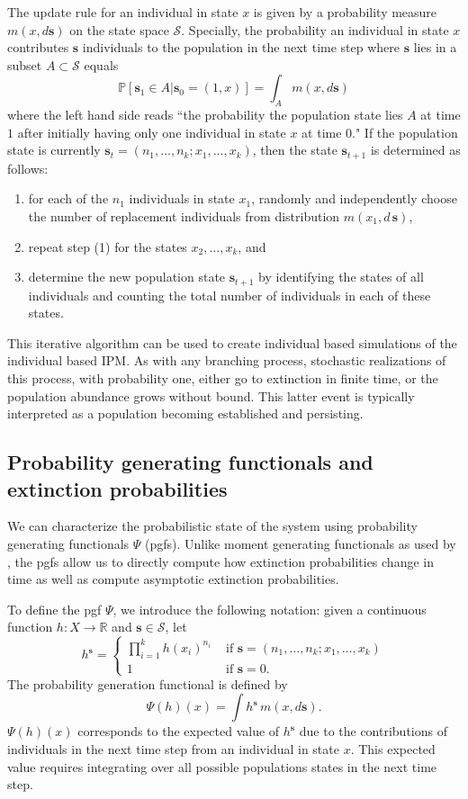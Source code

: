 \documentclass[12pt]{amsart}\usepackage[]{graphicx}\usepackage[]{color}
\def\R{\mathbb R}
\def\P{\mathbb P}
\def\S{\mathcal S}
\def\s{\mathbf s}
\begin{document}
The update rule for an individual in state $x$ is given by a probability measure $m(x,d\s)$ on the state space $\S$. Specially, the probability an individual in state $x$ contributes $\s$ individuals to the population in the next time step where $\s$ lies in a subset $A\subset \S$ equals
\[
\P[\s_1\in A| \s_0 =(1,x)]=\int_A m(x,d\s)
\]
where the left hand side reads ``the probability the population state lies $A$ at time $1$ after initially having only one individual in state $x$ at time $0$." If the population state is currently $\s_t=(n_1,\dots,n_k;x_1,\dots,x_k)$, then the state $\s_{t+1}$ is determined as follows:
\begin{enumerate}
\item for each of the $n_1$ individuals in state $x_1$, randomly and independently choose the number of replacement individuals from distribution $m(x_1,d\,\s)$,
\item repeat step (1) for the states $x_2,\dots, x_k$, and
\item determine the new population state $\s_{t+1}$ by identifying the states of all individuals and counting the total number of individuals in each of these states.
\end{enumerate}
This iterative algorithm can be used to create individual based simulations of the individual based IPM. As with any branching process, stochastic realizations of this process, with probability one, either go to extinction in finite time, or the population abundance grows without bound. This latter event is typically interpreted as a population becoming established and persisting.

\subsection*{Probability generating functionals and extinction probabilities}

We can characterize the probabilistic state of the system using probability generating functionals $\Psi$ (pgfs). Unlike moment generating functionals as used by \citet{harris-63}, the pgfs allow us to directly compute how extinction probabilities change in time as well as compute asymptotic extinction probabilities.

To define the pgf $\Psi$, we introduce the following notation: given a continuous function $h:X\to\R$ and $\s\in \S$, let
\[
h^\s=
\left\{
\begin{array}{cc}
\prod_{i=1}^k h(x_i)^{n_i}&\mbox{ if }\s=(n_1,\dots,n_k;x_1,\dots,x_k)\\
1 &\mbox{ if }\s=0.
\end{array}
\right.
\]
The probability generation functional is defined by
\begin{equation}\label{*}
\Psi(h)(x)=\int h^\s \,m(x,d\s).
\end{equation}
$\Psi(h)(x)$ corresponds to the expected value of $h^\s$ due to the contributions of individuals in the next time step from an individual in state $x$. This expected value requires integrating over all possible populations states in the next time step.
\end{document}
